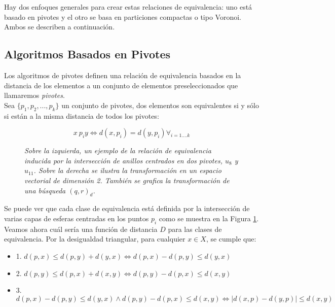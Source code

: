 Hay dos enfoques generales para crear estas relaciones de equivalencia: uno est\'a basado en pivotes y el otro se basa en particiones compactas o tipo Voronoi. Ambos se describen a continuaci\'on.

\subsection{Algoritmos Basados en Pivotes}

Los algoritmos de pivotes definen una relaci\'on de equivalencia basados en la distancia de los elementos a un conjunto de elementos preseleccionados que llamaremos \textit{pivotes}.\\

Sea $\{p_1, p_2,...,p_k\}$ un conjunto de pivotes, dos elementos son equivalentes si y s\'olo si est\'an a la misma distancia de todos los pivotes:

\[
x ~ p_i  y \Leftrightarrow d(x,p_i) = d(y,p_i) \forall_{i = 1....k}
\]

\begin{figure}[htb]
\centerline{ %
   \vspace{.2in}
   }
   \caption [Relaci\'on de equivalencia inducida por dos pivotes y su
   correspondiente transformaci\'on en un espacio vectorial]
     {\textsl{\footnotesize{Sobre la izquierda, un ejemplo de la relaci\'on de equivalencia inducida
        por la intersecci\'on de anillos centrados en dos pivotes, $u_8$ y $u_{11}$.
        Sobre la derecha se ilustra la transformaci\'on en un espacio vectorial de dimensi\'on 2.
    	Tambi\'en se grafica la transformaci\'on de una b\'usqueda $(q,r)_d$. }}}
\label{piv1}
\end{figure} 

Se puede ver que cada clase de equivalencia est\'a definida por la intersecci\'on de varias capas de esferas centradas en los puntos $p_i$ como se muestra en la Figura \ref{piv1}.\\

Veamos ahora cu\'al ser\'ia una funci\'on de distancia $D$ para las clases de equivalencia.  Por la desigualdad triangular, para cualquier $x \in X$, se cumple que:

\begin{itemize}
\item 1. $d(p,x) \leq d(p,y) + d(y,x) \Leftrightarrow d(p,x) - d(p,y) \leq d(y,x)$
\item 2. $d(p,y) \leq d(p,x) + d(x,y) \Leftrightarrow d(p,y) - d(p,x) \leq d(x,y)$
\item 3. $d(p,x) - d(p,y) \leq d(y,x) \wedge d(p,y) - d(p,x) \leq d(x,y) \Leftrightarrow |d(x,p) - d(y,p)| \leq d(x,y)$
\end{itemize}

